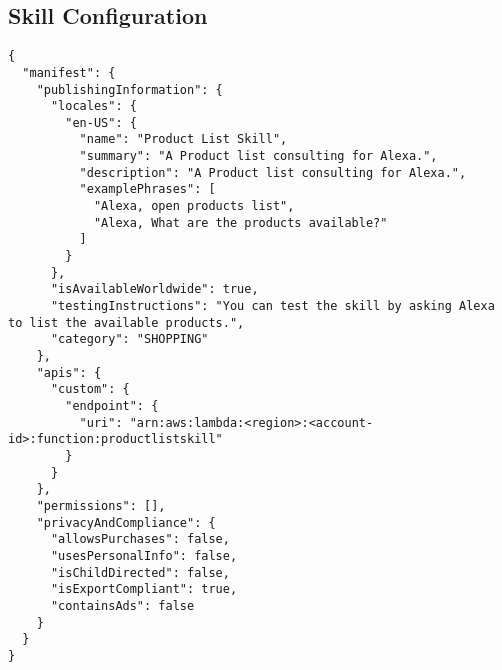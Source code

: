 \documentclass[12pt]{article}
\begin{document}
\subsection{Skill Configuration}\label{appendix:skill_config}
\begin{lstlisting}
{
  "manifest": {
    "publishingInformation": {
      "locales": {
        "en-US": {
          "name": "Product List Skill",
          "summary": "A Product list consulting for Alexa.",
          "description": "A Product list consulting for Alexa.",
          "examplePhrases": [
            "Alexa, open products list",
            "Alexa, What are the products available?"
          ]
        }
      },
      "isAvailableWorldwide": true,
      "testingInstructions": "You can test the skill by asking Alexa to list the available products.",
      "category": "SHOPPING"
    },
    "apis": {
      "custom": {
        "endpoint": {
          "uri": "arn:aws:lambda:<region>:<account-id>:function:productlistskill"
        }
      }
    },
    "permissions": [],
    "privacyAndCompliance": {
      "allowsPurchases": false,
      "usesPersonalInfo": false,
      "isChildDirected": false,
      "isExportCompliant": true,
      "containsAds": false
    }
  }
}
\end{lstlisting}
\end{document}
